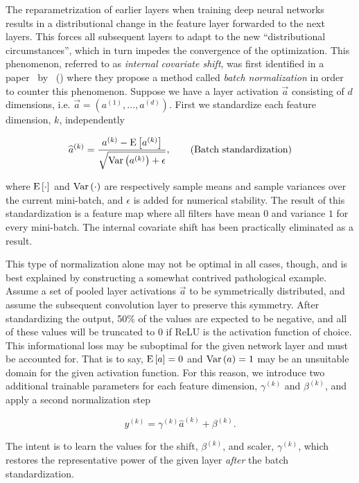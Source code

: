 The reparametrization of earlier layers when training deep neural networks results in a distributional change in the feature layer forwarded to the next layers.
This forces all subsequent layers to adapt to the new \enquote{distributional circumstances}, which in turn impedes the convergence of the optimization.
This phenomenon, referred to as \textit{internal covariate shift}, was first identified in a paper~\cite{batch-normalization} by \citeauthor{batch-normalization}~(\citeyear{batch-normalization}) where they propose a method called \textit{batch normalization} in order to counter this phenomenon.
Suppose we have a layer activation $\vec{a}$ consisting of $d$ dimensions, i.e. $\vec{a} = (a^{(1)}, \ldots, a^{(d)})$.
First we standardize each feature dimension, $k$, independently

\begin{equation*}
  \widehat{a}^{(k)}
  =
  \frac{
    a^{(k)} - \mathrm{E} \left[a^{(k)} \right]
  }{
    \sqrt{\mathrm{Var} \left(a^{(k)} \right) + \epsilon}
  },
  \tag{Batch standardization}
\end{equation*}

where $\mathrm{E} \left[\cdot \right]$ and $\mathrm{Var} \left(\cdot \right)$ are respectively sample means and sample variances over the current mini-batch, and $\epsilon$ is added for numerical stability.
The result of this standardization is a feature map where all filters have mean $0$ and variance $1$ for every mini-batch.
The internal covariate shift has been practically eliminated as a result.

This type of normalization alone may not be optimal in all cases, though, and is best explained by constructing a somewhat contrived pathological example.
Assume a set of pooled layer activations $\vec{a}$ to be symmetrically distributed, and assume the subsequent convolution layer to preserve this symmetry.
After standardizing the output, 50\% of the values are expected to be negative, and all of these values will be truncated to $0$ if ReLU is the activation function of choice.
This informational loss may be suboptimal for the given network layer and must be accounted for.
That is to say, $\mathrm{E} \left[a \right] =  0$ and $\mathrm{Var} \left(a \right) = 1$ may be an unsuitable domain for the given activation function.
For this reason, we introduce two additional trainable parameters for each feature dimension, $\gamma^{(k)}$ and $\beta^{(k)}$, and apply a second normalization step

\begin{equation*}
  y^{(k)} = \gamma^{(k)} \widehat{a}^{(k)} + \beta^{(k)}.
  \tag{Trainable normalization}
\end{equation*}

The intent is to learn the values for the shift, $\beta^{(k)}$, and scaler, $\gamma^{(k)}$, which restores the representative power of the given layer \textit{after} the batch standardization.
